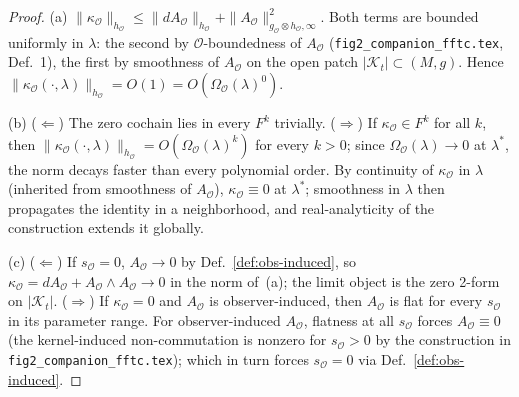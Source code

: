 \documentclass[11pt]{article}
\newcommand{\Obs}{\mathcal{O}}
\newcommand{\OmegaO}{\Omega_{\Obs}}
\newcommand{\kappaO}{\kappa_{\Obs}}
\newcommand{\AO}{A_{\Obs}}
\newcommand{\hO}{h_{\Obs}}
\newcommand{\gO}{g_{\Obs}}
\newcommand{\rmin}{s_{\Obs}}
\newcommand{\Kt}{\mathcal{K}_t}
\begin{document}
\begin{proof}
(a) $\|\kappaO\|_{\hO} \leq \|d\AO\|_{\hO}
+ \|\AO\|^2_{\gO \otimes \hO, \infty}$. Both terms are bounded
uniformly in $\lambda$: the second by $\Obs$-boundedness of $\AO$
(\texttt{fig2\_companion\_fftc.tex}, Def.~1), the first by
smoothness of $\AO$ on the open patch
$|\Kt| \subset (M, g)$. Hence $\|\kappaO(\cdot, \lambda)\|_{\hO}
= O(1) = O(\OmegaO(\lambda)^0)$.

(b) ($\Leftarrow$) The zero cochain lies in every $F^k$ trivially.
($\Rightarrow$) If $\kappaO \in F^k$ for all $k$, then
$\|\kappaO(\cdot, \lambda)\|_{\hO} = O(\OmegaO(\lambda)^k)$ for
every $k > 0$; since $\OmegaO(\lambda) \to 0$ at $\lambda^*$, the
norm decays faster than every polynomial order. By continuity of
$\kappaO$ in $\lambda$ (inherited from smoothness of $\AO$),
$\kappaO \equiv 0$ at $\lambda^*$; smoothness in $\lambda$ then
propagates the identity in a neighborhood, and real-analyticity
of the construction extends it globally.

(c) ($\Leftarrow$) If $\rmin = 0$, $\AO \to 0$ by
Def.~\ref{def:obs-induced}, so
$\kappaO = d\AO + \AO \wedge \AO \to 0$ in the norm of~(a);
the limit object is the zero 2-form on $|\Kt|$.
($\Rightarrow$) If $\kappaO = 0$ and $\AO$ is observer-induced,
then $\AO$ is flat for every $\rmin$ in its parameter range.
For observer-induced $\AO$, flatness at all $\rmin$ forces
$\AO \equiv 0$ (the kernel-induced non-commutation is nonzero
for $\rmin > 0$ by the construction in
\texttt{fig2\_companion\_fftc.tex}); which in turn forces
$\rmin = 0$ via Def.~\ref{def:obs-induced}.
\end{proof}
\end{document}
